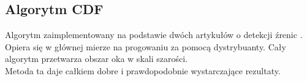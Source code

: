 \subsection{Algorytm CDF}
Algorytm zaimplementowany na podstawie dwóch artykułów o detekcji źrenic \cite{IMECSPupilCDFAnalysis}
\cite{EyePupilWebCam}. Opiera się w głównej mierze na progowaniu za pomocą dystrybuanty. Cały algorytm przetwarza obszar oka w skali szarości. \\
Metoda ta daje całkiem dobre i prawdopodobnie wystarczające rezultaty. \\

\begin{figure}[!h]
    \begin{center}
        \hspace{3mm}

\end{center}
\end{figure}
